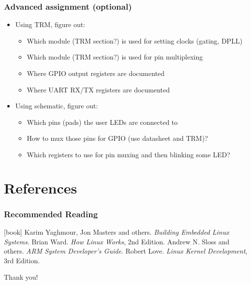\documentclass[aspectratio=169]{beamer}
\begin{document}
\begin{frame}
  \frametitle{Advanced assignment (optional)}
  \begin{itemize}
    \item Using TRM, figure out:
      \begin{itemize}
        \item Which module (TRM section?) is used for setting clocks (gating, DPLL)
        \item Which module (TRM section?) is used for pin multiplexing
        \item Where GPIO output registers are documented
        \item Where UART RX/TX registers are documented
      \end{itemize}
    \item Using schematic, figure out:
      \begin{itemize}
        \item Which pins (pads) the user LEDs are connected to
        \item How to mux those pins for GPIO (use datasheet and TRM)?
        \item Which registers to use for pin muxing and then blinking some LED?
      \end{itemize}
  \end{itemize}
\end{frame}

\section*{References}

\begin{frame}
  \frametitle{Recommended Reading}
  \begin{thebibliography}{}
  [book]
      Karim Yaghmour, Jon Masters and others.
      \newblock \emph{Building Embedded Linux Systems}.
      Brian Ward.
      \newblock \emph{How Linux Works}, 2nd Edition.
      Andrew N. Sloss and others.
      \newblock \emph{ARM System Developer's Guide}.
      Robert Love.
     \newblock \emph{Linux Kernel Development}, 3rd Edition.
  \end{thebibliography}
\end{frame}

\begin{frame}[standout]
  Thank you!
\end{frame}
\end{document}
